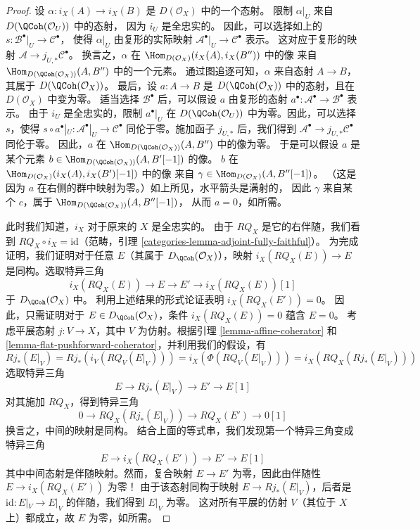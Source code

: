 \begin{proof}
\medskip\noindent
设 $\alpha : i_X(A) \to i_X(B)$ 是
$D(\mathcal{O}_X)$ 中的一个态射。 %
限制 $\alpha|_U$ 来自 $D(\QCoh(\mathcal{O}_U))$ 中的态射，
因为 $i_U$ 是全忠实的。 %
因此，可以选择如上的
$s : \mathcal{B}^\bullet|_U \to \mathcal{C}^\bullet$，
使得 $\alpha|_U$ 由复形的实际映射
$\mathcal{A}^\bullet|_U \to \mathcal{C}^\bullet$ 表示。
这对应于复形的映射
$\mathcal{A} \to j_{U, *}\mathcal{C}^\bullet$。
换言之，$\alpha$ 在
$\Hom_{D(\mathcal{O}_X)}(i_X(A), i_X(B''))$ 中的像
来自 $\Hom_{D(\QCoh(\mathcal{O}_X))}(A, B'')$ 中的一个元素。
通过图追逐可知，$\alpha$ 来自态射 $A \to B$，
其属于 $D(\QCoh(\mathcal{O}_X))$。
最后，设 $a : A \to B$ 是
$D(\QCoh(\mathcal{O}_X))$ 中的态射，且在 $D(\mathcal{O}_X)$ 中变为零。
适当选择 $\mathcal{B}^\bullet$ 后，可以假设 $a$ 由复形的态射
$a^\bullet : \mathcal{A}^\bullet \to \mathcal{B}^\bullet$ 表示。
由于 $i_U$ 是全忠实的，限制 $a^\bullet|_U$ 在
$D(\QCoh(\mathcal{O}_U))$ 中为零。因此，可以选择 $s$，使得
$s \circ a^\bullet|_U : \mathcal{A}^\bullet|_U \to \mathcal{C}^\bullet$
同伦于零。施加函子 $j_{U, *}$ 后，我们得到
$\mathcal{A}^\bullet \to j_{U, *}\mathcal{C}^\bullet$ 同伦于零。
因此，$a$ 在
$\Hom_{D(\QCoh(\mathcal{O}_X))}(A, B'')$ 中的像为零。
于是可以假设 $a$ 是某个元素
$b \in \Hom_{D(\QCoh(\mathcal{O}_X))}(A, B'[-1])$ 的像。
$b$ 在
$\Hom_{D(\mathcal{O}_X)}(i_X(A), i_X(B')[-1])$ 中的像
来自
$\gamma \in \Hom_{D(\mathcal{O}_X)}(A, B''[-1])$。 %
（这是因为 $a$ 在右侧的群中映射为零。）如上所见，水平箭头是满射的，
因此 $\gamma$ 来自某个 $c$，属于
$\Hom_{D(\QCoh(\mathcal{O}_X))}(A, B''[-1])$，
从而 $a = 0$，如所需。

\medskip\noindent
此时我们知道，$i_X$ 对于原来的 $X$ 是全忠实的。
由于 $RQ_X$ 是它的右伴随，我们看到
$RQ_X \circ i_X = \text{id}$（范畴，引理
\ref{categories-lemma-adjoint-fully-faithful}）。
为完成证明，我们证明对于任意 $E$（其属于
$D_\QCoh(\mathcal{O}_X)$），映射
$i_X(RQ_X(E)) \to E$ 是同构。选取特异三角
$$
i_X(RQ_X(E)) \to E \to E' \to i_X(RQ_X(E))[1]
$$
于 $D_\QCoh(\mathcal{O}_X)$ 中。
利用上述结果的形式论证表明 $i_X(RQ_X(E')) = 0$。
因此，只需证明对于 $E \in D_\QCoh(\mathcal{O}_X)$，条件
$i_X(RQ_X(E)) = 0$ 蕴含 $E = 0$。
考虑平展态射 $j : V \to X$，其中 $V$ 为仿射。根据引理
\ref{lemma-affine-coherator} 和
\ref{lemma-flat-pushforward-coherator}，并利用我们的假设，有
$$
Rj_*(E|_V) = Rj_*(i_V(RQ_V(E|_V))) = i_X(\Phi(RQ_V(E|_V))) =
i_X(RQ_X(Rj_*(E|_V)))
$$
选取特异三角
$$
E \to Rj_*(E|_V) \to E' \to E[1]
$$
对其施加 $RQ_X$，得到特异三角
$$
0 \to RQ_X(Rj_*(E|_V)) \to RQ_X(E') \to 0[1]
$$
换言之，中间的映射是同构。
结合上面的等式串，我们发现第一个特异三角变成特异三角
$$
E \to i_X(RQ_X(E')) \to E' \to E[1]
$$
其中中间态射是伴随映射。然而，复合映射
$E \to E'$ 为零，因此由伴随性 $E \to i_X(RQ_X(E'))$ 为零！
由于该态射同构于映射
$E \to Rj_*(E|_V)$，后者是
$\text{id} : E|_V \to E|_V$ 的伴随，我们得到 $E|_V$ 为零。
这对所有平展的仿射 $V$（其位于 $X$ 上）都成立，故 $E$ 为零，如所需。
\end{proof}

